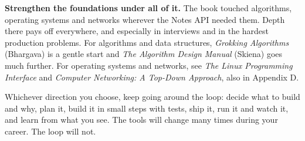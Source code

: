 \textbf{Strengthen the foundations under all of it.} The book touched algorithms, operating systems and networks wherever the Notes API needed them. Depth there pays off everywhere, and especially in interviews and in the hardest production problems. For algorithms and data structures, \emph{Grokking Algorithms} (Bhargava) is a gentle start and \emph{The Algorithm Design Manual} (Skiena) goes much further. For operating systems and networks, see \emph{The Linux Programming Interface} and \emph{Computer Networking: A Top-Down Approach}, also in Appendix D.

Whichever direction you choose, keep going around the loop: decide what to build and why, plan it, build it in small steps with tests, ship it, run it and watch it, and learn from what you see. The tools will change many times during your career. The loop will not.

